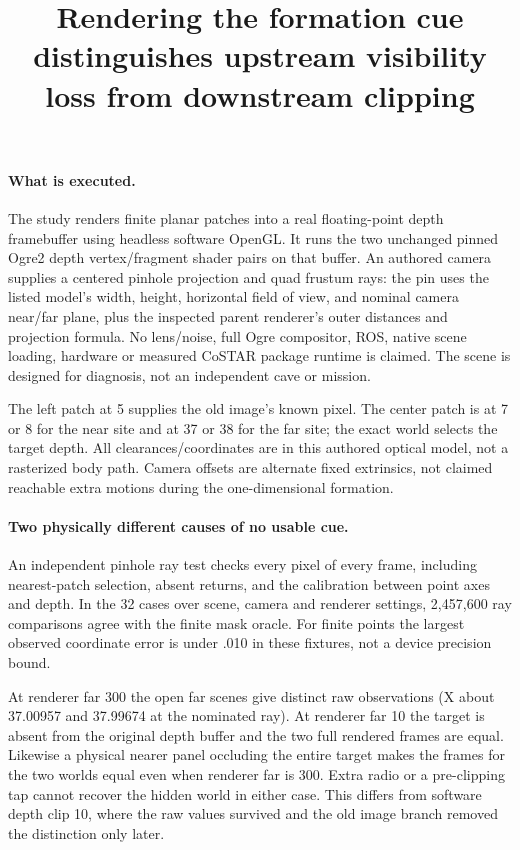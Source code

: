 \documentclass{article}
\begin{document}
\title{Rendering the formation cue distinguishes upstream visibility loss from downstream clipping}
\maketitle

\paragraph{What is executed.}
The study renders finite planar patches into a real floating-point
depth framebuffer using headless software OpenGL. It runs the two
unchanged pinned Ogre2 depth vertex/fragment shader pairs on that
buffer. An authored camera supplies a centered pinhole projection and
quad frustum rays: the pin uses the listed model's width, height,
horizontal field of view, and nominal camera near/far plane, plus the
inspected parent renderer's outer distances and projection formula.
No lens/noise, full Ogre compositor, ROS, native scene loading, hardware
or measured CoSTAR package runtime is claimed. The scene is designed
for diagnosis, not an independent cave or mission.

The left patch at 5 supplies the old image's known pixel. The
center patch is at 7 or 8 for the near site and at 37 or 38 for
the far site; the exact world selects the target depth. All
clearances/coordinates are in this authored optical model, not a
rasterized body path. Camera offsets are alternate fixed
extrinsics, not claimed reachable extra motions during the
one-dimensional formation.

\paragraph{Two physically different causes of no usable cue.}
An independent pinhole ray test checks every pixel of every frame,
including nearest-patch selection, absent returns, and the calibration
between point axes and depth. In the 32 cases over scene, camera and
renderer settings, 2,457,600 ray comparisons agree with the finite
mask oracle. For finite points the largest observed coordinate
error is under .010 in these fixtures, not a device precision bound.

At renderer far 300 the open far scenes give distinct raw
observations (X about 37.00957 and 37.99674 at the nominated ray).
At renderer far 10 the target is absent from the original
depth buffer and the two full rendered frames are equal.
Likewise a physical nearer panel occluding the entire target
makes the frames for the two worlds equal even when renderer
far is 300. Extra radio or a pre-clipping tap cannot recover
the hidden world in either case. This differs from software
depth clip 10, where the raw values survived and the old image
branch removed the distinction only later.
\end{document}
